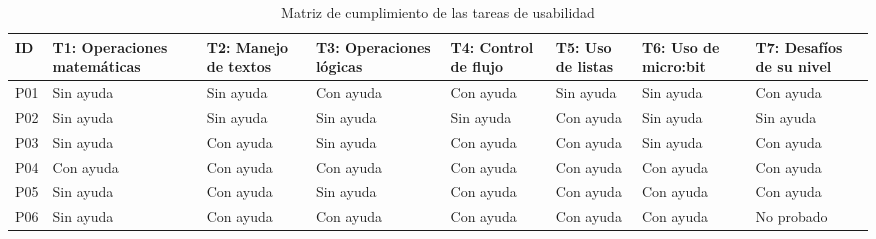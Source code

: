 \begin{table}[H]
    \caption{Matriz de cumplimiento de las tareas de usabilidad}
    \label{tab:resultados-usabilidad}
    \begingroup
    \renewcommand{\TableBodyFontSize}{\footnotesize}
    \setlength{\tabcolsep}{5pt}
    \begin{tabularx}{\textwidth}{l X X X X X X X}
        \hline
        \textbf{ID} & \textbf{T1: Operaciones matemáticas} & \textbf{T2: Manejo de textos} & \textbf{T3: Operaciones lógicas} & \textbf{T4: Control de flujo} & \textbf{T5: Uso de listas} & \textbf{T6: Uso de micro:bit} & \textbf{T7: Desafíos de su nivel} \\
        \hline
        P01         & Sin ayuda                            & Sin ayuda                     & Con ayuda                        & Con ayuda                     & Sin ayuda                  & Sin ayuda                     & Con ayuda                         \\
        P02         & Sin ayuda                            & Sin ayuda                     & Sin ayuda                        & Sin ayuda                     & Con ayuda                  & Sin ayuda                     & Sin ayuda                         \\
        P03         & Sin ayuda                            & Con ayuda                     & Sin ayuda                        & Con ayuda                     & Con ayuda                  & Sin ayuda                     & Con ayuda                         \\
        P04         & Con ayuda                            & Con ayuda                     & Con ayuda                        & Con ayuda                     & Con ayuda                  & Con ayuda                     & Con ayuda                         \\
        P05         & Sin ayuda                            & Con ayuda                     & Sin ayuda                        & Con ayuda                     & Con ayuda                  & Con ayuda                     & Con ayuda                         \\
        P06         & Sin ayuda                            & Con ayuda                     & Con ayuda                        & Con ayuda                     & Con ayuda                  & Con ayuda                     & No probado                        \\
        \hline
    \end{tabularx}
    \endgroup
\end{table}

